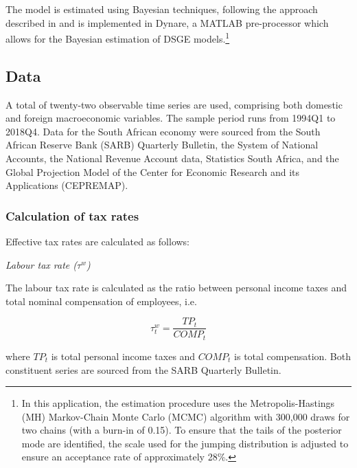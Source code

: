 \documentclass[a4paper,11pt]{article}
\numberwithin{equation}{section}
\begin{document}
The model is estimated using Bayesian techniques, following the approach described in \cite{an2007} and is implemented in Dynare, a MATLAB pre-processor which allows for the Bayesian estimation of DSGE models.\footnote{In this application, the estimation procedure uses the Metropolis-Hastings (MH) Markov-Chain Monte Carlo (MCMC) algorithm with 300,000 draws for two chains (with a burn-in of 0.15). To ensure that the tails of the posterior mode are identified, the scale used for the jumping distribution is adjusted to ensure an acceptance rate of approximately 28\%.} 
	
	
	\subsection{Data}
	
	A total of twenty-two observable time series are used, comprising both domestic and foreign macroeconomic variables. The sample period runs from 1994Q1 to 2018Q4. Data for the South African economy were sourced from the South African Reserve Bank (SARB) Quarterly Bulletin, the System of National Accounts, the National Revenue Account data, Statistics South Africa, and the Global Projection Model of the Center for Economic Research and its Applications (CEPREMAP).
	
	
	
	\subsubsection{Calculation of tax rates}
	Effective tax rates are calculated as follows:

	\textit{Labour tax rate ($\tau^w$)}

	The labour tax rate is calculated as the ratio between personal income taxes and total nominal compensation of employees, i.e.
	
	\begin{equation}
		\tau^w_t = \frac{TP_t}{COMP_t}
	\end{equation}
	
	where $TP_t$ is total personal income taxes and $COMP_t$ is total compensation. Both constituent series are sourced from the SARB Quarterly Bulletin.
	
\end{document}
